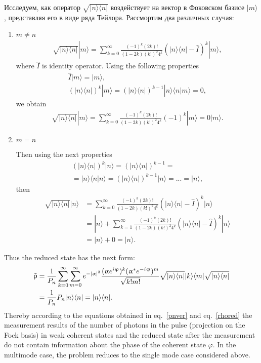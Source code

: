 %
Исследуем, как оператор $\sqrt{|n\rangle\langle n|}$ воздействует на вектор в Фоковском базисе $|m\rangle$, представляя его в виде ряда Тейлора. Рассмортим два различных случая:
%
\begin{enumerate}
    \item $m \neq n$
    \begin{align}
        \sqrt{|n\rangle\langle n|}|m\rangle = \sum_{k=0}^{\infty} \frac{(-1)^k(2k)!}{(1-2k)(k!)^2 4^k}(|n\rangle\langle n|-\hat{I})^k|m\rangle ,
    \end{align}
    where $\hat{I}$ is identity operator. Using the following properties
    \begin{gather}
        \hat{I}|m\rangle=|m\rangle, \\
        (|n\rangle\langle n|)^k |m\rangle = (|n\rangle\langle n|)^{k-1} |n\rangle\langle n|m\rangle = 0,
    \end{gather}
    we obtain
    \begin{align}
       \sqrt{|n\rangle\langle n|}|m\rangle = \sum_{k=0}^{\infty} \frac{(-1)^k(2k)!}{(1-2k)(k!)^2 4^k}(-1)^k|m\rangle = 0 |m\rangle.
    \end{align}
    \item $m=n$
    
    Then using the next properties
    \begin{align}
        (|n\rangle\langle n|)^k |n\rangle = (|n\rangle\langle n|)^{k-1}=\nonumber\\ =|n\rangle\langle n|n\rangle = (|n\rangle\langle n|)^{k-1} |n\rangle = ... = |n\rangle,
    \end{align}
    then
    \begin{align}
        \sqrt{|n\rangle\langle n|}|n\rangle &= \sum_{k=0}^{\infty} \frac{(-1)^k(2k)!}{(1-2k)(k!)^2 4^k}(|n\rangle\langle n|-\hat{I})^k|n\rangle \nonumber\\
        &=|n\rangle + \sum_{k=1}^{\infty} \frac{(-1)^k(2k)!}{(1-2k)(k!)^2 4^k}(|n\rangle\langle n|-\hat{I})^k|n\rangle \nonumber\\
        &=|n\rangle + 0 = |n\rangle.
    \end{align}
\end{enumerate}
%
Thus the reduced state has the next form:
%
\begin{align}
   \Tilde{\rho}&=\frac{1}{P_n}\sum_{k=0}^{\infty}\sum_{m=0}^{\infty} e^{-|\alpha|^2} \frac{(\alpha e^{i \varphi})^k(\alpha^{*} e^{-i \varphi})^m}{\sqrt{k!m!}} \sqrt{|n\rangle\langle n|}|k\rangle\langle m |\sqrt{|n\rangle\langle n|} \nonumber \\
   &= \frac{1}{P_n} P_n |n\rangle\langle n| = |n\rangle\langle n|. \label{rhored}
\end{align}
%
Thereby according to the equations obtained in eq.~\ref{pnver} and eq.~\ref{rhored} the measurement results  of the number of photons in the pulse (projection on the Fock basis) in weak coherent states and the reduced state after the measurement do not contain information about the phase of the coherent state $\varphi$. In the multimode case, the problem reduces to the single mode case considered above.

